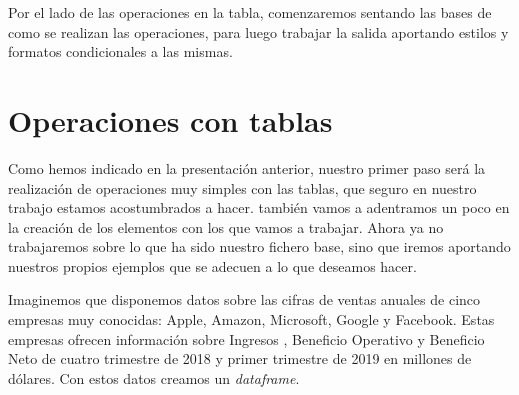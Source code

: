 \documentclass[
]{book}
\begin{document}
Por el lado de las operaciones en la tabla, comenzaremos sentando las bases de como se realizan las operaciones, para luego trabajar la salida aportando estilos y formatos condicionales a las mismas.

\hypertarget{operaciones-con-tablas}{%
\section{Operaciones con tablas}\label{operaciones-con-tablas}}

Como hemos indicado en la presentación anterior, nuestro primer paso será la realización de operaciones muy simples con las tablas, que seguro en nuestro trabajo estamos acostumbrados a hacer. también vamos a adentramos un poco en la creación de los elementos con los que vamos a trabajar. Ahora ya no trabajaremos sobre lo que ha sido nuestro fichero base, sino que iremos aportando nuestros propios ejemplos que se adecuen a lo que deseamos hacer.

Imaginemos que disponemos datos sobre las cifras de ventas anuales de cinco empresas muy conocidas: Apple, Amazon, Microsoft, Google y Facebook. Estas empresas ofrecen información sobre Ingresos , Beneficio Operativo y Beneficio Neto de cuatro trimestre de 2018 y primer trimestre de 2019 en millones de dólares. Con estos datos creamos un \emph{dataframe}.
\end{document}
